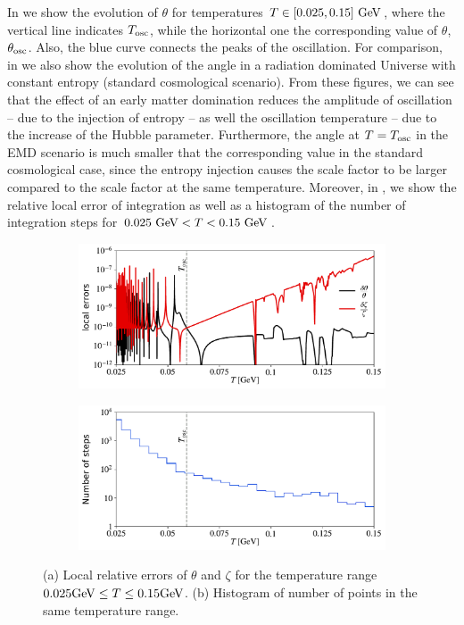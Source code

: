 \documentclass[11pt,a4paper]{article}
\begin{document}
%
In  we show the evolution  of $\theta$ for temperatures $T \in [0.025,0.15]~{\rm GeV}$, where the vertical line indicates $T_{\rm osc}{}$, while the horizontal one the corresponding value of $\theta$, $\theta_{\rm osc}{}$. Also, the blue curve connects the peaks of the oscillation. For comparison, in  we also show the evolution of the angle in a radiation dominated Universe with constant entropy (\ie standard cosmological scenario). From these figures, we can see that the effect of an early matter domination reduces the amplitude of oscillation -- due to the injection of entropy -- as well the oscillation temperature -- due to the increase of the Hubble parameter. Furthermore,  the angle at $T=T_{\rm osc}{}$ in the EMD scenario is much smaller that the corresponding value in the standard cosmological case, since the entropy injection causes the scale factor to be larger compared to the scale factor at the same temperature.
%
Moreover, in , we show the relative local error of integration as well as a histogram of the number of integration steps for $0.025~{\rm GeV} < T < 0.15 ~{\rm GeV}$.
%
\begin{figure}[h]
	\begin{subfigure}[]{0.5\textwidth}
		\includegraphics[width=1\textwidth]{local_errors-EMD.pdf}
		\caption{}
		\label{fig:local_errors-EMD}
	\end{subfigure}
	\begin{subfigure}[]{0.5\textwidth}
		\includegraphics[width=1\textwidth]{histogram-EMD.pdf}
		\caption{}
		\label{fig:histogram-EMD}
	\end{subfigure}
	\caption{(a) Local relative errors of $\theta$ and $\zeta$ for the temperature range $0.025{\rm GeV} \leq T \leq 0.15{\rm GeV}$. 
			 (b) Histogram of number of points in the same temperature range.}
	\label{fig:RK_response}
\end{figure}
\end{document}
